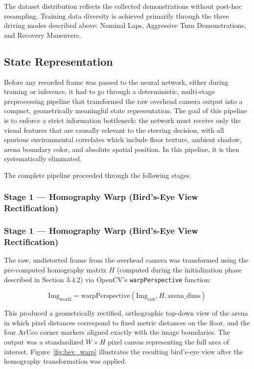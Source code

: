 The dataset distribution reflects the collected demonstrations without post-hoc resampling.
Training data diversity is achieved primarily through the three driving modes described
above: Nominal Laps, Aggressive Turn Demonstrations, and Recovery Maneuvers.

\subsection{State Representation}

Before any recorded frame was passed to the neural network, either during training or inference, it had to
go through a deterministic, multi-stage preprocessing pipeline that transformed the raw overhead
camera output into a compact, geometrically meaningful state representation. The goal of this
pipeline is to enforce a strict information bottleneck: the network must receive only the visual
features that are causally relevant to the steering decision, with all spurious environmental
correlates which include floor texture, ambient shadow, arena boundary color, and absolute spatial
position. In this pipeline, it is then systematically eliminated.

The complete pipeline proceeded through the following stages.

\subsubsection{Stage 1 — Homography Warp (Bird's-Eye View Rectification)}

\subsubsection{Stage 1 — Homography Warp (Bird's-Eye View Rectification)}

The raw, undistorted frame from the overhead camera was transformed using the 
pre-computed homography matrix $H$ (computed during the initialization phase 
described in Section 3.4.2) via OpenCV's \texttt{warpPerspective} function:

\begin{equation}
    \text{Img}_{\text{world}} = \text{warpPerspective}(\text{Img}_{\text{raw}}, H, \text{arena\_dims})
    \label{eq:warp}
\end{equation}

This produced a geometrically rectified, orthographic top-down view of the arena 
in which pixel distances correspond to fixed metric distances on the floor, and 
the four ArUco corner markers aligned exactly with the image boundaries. The 
output was a standardized $W \times H$ pixel canvas representing the full area 
of interest. Figure~\ref{fig:bev_warp} illustrates the resulting bird's-eye 
view after the homography transformation was applied.

